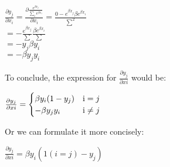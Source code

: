 \documentclass[12pt]{article}
\begin{document}
\begin{center}
    $
     \frac{\partial y_{j}}{\partial x_{i}}=
    \frac{\partial \frac{e^{\beta x_{j}}}{\sum_{i}e^{\beta x_{i}}}}{\partial x_{i}}=
    \frac{0 - e^{\beta x_{j}}\beta e^{\beta x_{i}}}{\sum^2}  
    $\\
    $
    = -\frac{e^{\beta x_{j}}}{\sum}\frac{\beta e^{\beta x_{i}}}{\sum}
    $\\
    $
    = -y_{j}\beta y_{i}
    $\\
    $
    = -\beta y_{j}y_{i}
    $
\end{center}To conclude, the expression for $\frac{\partial y_{j}}{\partial x{i}}$ would be:
\begin{center}
    $
    \frac{\partial y_{j}}{\partial x{i}}=
    \begin{cases}
        \beta y_{i}(1-y_{j}) & \text i = j \\
        -\beta y_{j}y_{i} & \text i \neq j
    \end{cases}
    $
\end{center}Or we can formulate it more concisely:
\begin{center}
    $
        \frac{\partial y_{j}}{\partial x{i}}=
        \beta y_{i}(1(i = j) - y_{j})
    $
\end{center}
\end{document}
